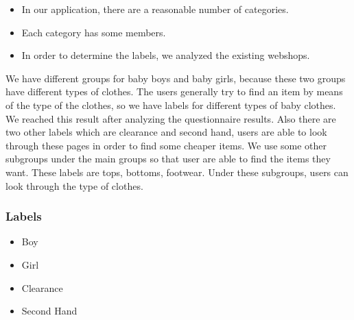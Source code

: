 \begin{itemize}
\item In our application, there are a reasonable number of categories. 
\item Each category has some members. 
\item In order to determine the labels, we analyzed the existing webshops.
\end{itemize}

We have different groups for baby boys and baby girls, because these two groups have different types of clothes. The users generally try to find an item by means of the type of the clothes, so we have labels for different types of baby clothes. We reached this result after analyzing the questionnaire results. Also there are two other labels which are clearance and second hand, users are able to look through these pages in order to find some cheaper items.
We use some other subgroups under the main groups so that user are able to find the items they want. These labels are tops, bottoms, footwear. Under these subgroups, users can look through the type of clothes.

\subsubsection{Labels}
\begin{itemize}
\setlength{\itemsep}{-3pt}
\setlength{\parskip}{0pt}
\setlength{\parsep}{0pt}
 \item Boy 
 \item Girl 
 \item Clearance 
 \item Second Hand
\end{itemize}

